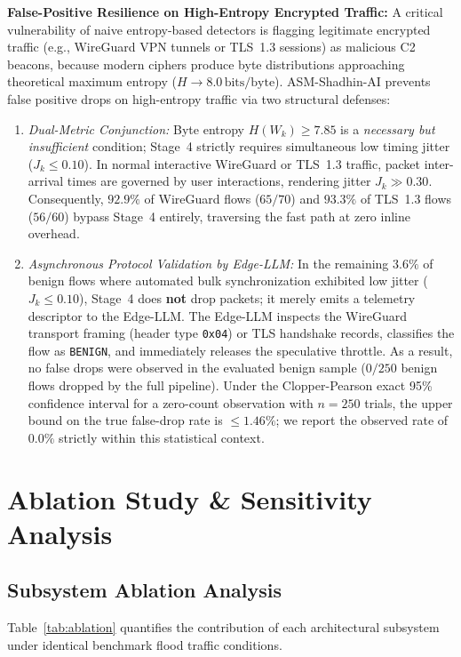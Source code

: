 \documentclass[journal]{IEEEtran}
\renewcommand{\_}{\textunderscore\allowbreak}
\begin{document}
\textbf{False-Positive Resilience on High-Entropy Encrypted Traffic:}
A critical vulnerability of naive entropy-based detectors is flagging legitimate encrypted traffic (e.g., WireGuard VPN tunnels or TLS~1.3 sessions) as malicious C2 beacons, because modern ciphers produce byte distributions approaching theoretical maximum entropy ($H \to 8.0\,\text{bits/byte}$). ASM-Shadhin-AI prevents false positive drops on high-entropy traffic via two structural defenses:
\begin{enumerate}
  \item \textit{Dual-Metric Conjunction:} Byte entropy $H(W_k) \ge 7.85$ is a \emph{necessary but insufficient} condition; Stage~4 strictly requires simultaneous low timing jitter ($J_k \le 0.10$). In normal interactive WireGuard or TLS~1.3 traffic, packet inter-arrival times are governed by user interactions, rendering jitter $J_k \gg 0.30$. Consequently, $92.9\%$ of WireGuard flows ($65/70$) and $93.3\%$ of TLS~1.3 flows ($56/60$) bypass Stage~4 entirely, traversing the fast path at zero inline overhead.
  \item \textit{Asynchronous Protocol Validation by Edge-LLM:} In the remaining
    $3.6\%$ of benign flows where automated bulk synchronization exhibited low
    jitter ($J_k \le 0.10$), Stage~4 does \textbf{not} drop packets; it merely
    emits a telemetry descriptor to the Edge-LLM. The Edge-LLM inspects the
    WireGuard transport framing (header type \texttt{0x04}) or TLS handshake
    records, classifies the flow as \texttt{BENIGN}, and immediately releases
    the speculative throttle. As a result, no false drops were observed in the
    evaluated benign sample ($0/250$ benign flows dropped by the full pipeline).
    Under the Clopper-Pearson exact 95\% confidence interval for a zero-count
    observation with $n=250$ trials, the upper bound on the true false-drop rate
    is $\le 1.46\%$; we report the observed rate of $0.0\%$ strictly within this
    statistical context.
\end{enumerate}

\section{Ablation Study \& Sensitivity Analysis}
\subsection{Subsystem Ablation Analysis}
Table~\ref{tab:ablation} quantifies the contribution of each architectural subsystem under identical benchmark flood traffic conditions.
\end{document}
